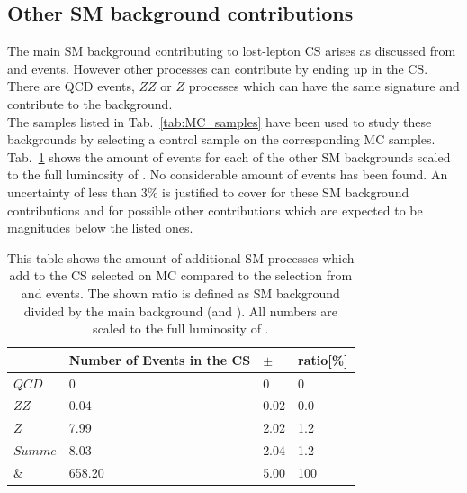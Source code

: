 \subsection{Other SM background contributions}
\label{sec:other_sm_contribution}
The main SM background contributing to lost-lepton CS arises as discussed from \ttbar and \wpj events. However other processes can contribute by ending up in the CS. There are QCD events, $ZZ$ or $Z$  processes which can have the same signature and contribute to the background.\\
The samples listed in Tab.~\ref{tab:MC_samples} have been used to study these backgrounds by selecting a control sample on the corresponding MC samples.
Tab.~\ref{tab:other_sm_contribution} shows the amount of events for each of the other SM backgrounds scaled to the full luminosity of \lumi. No considerable amount of events has been found. An uncertainty of less than $3\%$ is justified to cover for these SM background contributions and for possible other contributions which are expected to be magnitudes below the listed ones.

\begin{table}[htb]
\begin{center}
    \begin{tabular}{|l|l|l|l|}
        \hline
			& Number of Events in the CS 	& $\pm$         & ratio[\%]	\\  \hline
        $QCD$ 		&0 				& 0 		&0		\\ 
        $ZZ$   		&0.04  				& 0.02		&0.0	 	\\
        $Z$    		&7.99  				& 2.02		&1.2 		\\ 
        $Summe$ 	&8.03				& 2.04		&1.2 		\\ \hline
	\wpj \& \ttbar 	& 658.20	&5.00  & 100   \\ 
        \hline

    \end{tabular}
\caption{This table shows the amount of additional SM processes which add to the CS selected on MC compared to the selection from \ttbar and \wpj events. The shown ratio is defined as SM background divided by the main background (\ttbar and \wpj). All numbers are scaled to the full luminosity of \lumi .\label{tab:other_sm_contribution}}
\end{center}


\end{table}

\clearpage






